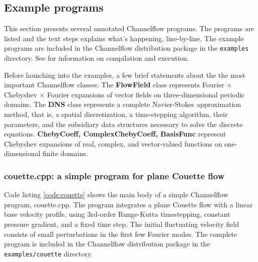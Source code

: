 \documentclass{article}[12pt]
\begin{document}
\subsection{Example programs}
\label{sec:examples}

This section presents several annotated Channelflow programs. The
programs are listed and the text steps explains what's happening,
line-by-line. The example programs are included in the Channelflow
distribution package in the {\tt examples} directory. See
 for information on compilation and execution.

Before launching into the examples, a few brief statements about the
the most important Channelflow classes: The {\bf FlowField} class
represents Fourier $\times$ Chebyshev $\times$ Fourier expansions of
vector fields on three-dimensional periodic domains. The {\bf DNS} class
represents a complete Navier-Stokes approximation method, that is, a
spatial discretization, a time-stepping algorithm, their parameters,
and the subsidiary data structures necessary to solve the discrete
equations. {\bf ChebyCoeff, ComplexChebyCoeff, BasisFunc} represent
Chebyshev expansions of real, complex, and vector-valued functions on
one-dimensional finite domains.


\subsubsection{couette.cpp: a simple program for plane Couette flow}
\label{sec:couette}

Code listing \ref{code:couette} shows the main body of a simple
Channelflow program, couette.cpp. The program integrates a plane
Couette flow with a linear base velocity profile, using 3rd-order
Runge-Kutta timestepping, constant pressure gradient, and a fixed time
step. The initial fluctuating velocity field consists of small
perturbations in the first few Fourier modes. The complete program is
included in the Channelflow distribution package in the {\tt
examples/couette} directory.
\end{document}
